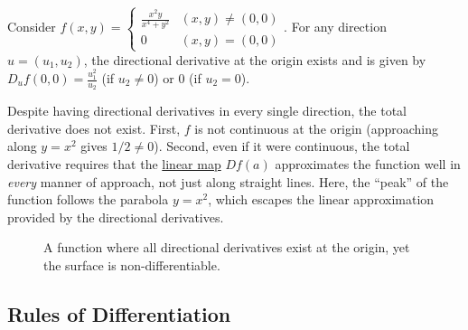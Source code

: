 	\begin{example}
	  \label{ex:all-directional-derivatives-exist-but-not}
		Consider $f(x, y) = \begin{cases} \frac{x^2 y}{x^4 + y^2} & (x, y) \neq (0, 0) \\ 0 & (x, y) = (0, 0) \end{cases}$. For any direction $u = (u_1, u_2)$, the directional derivative at the origin exists and is given by $D_{u}f(0,0) = \frac{u_1^2}{u_2}$ (if $u_2 \neq 0$) or $0$ (if $u_2 = 0$). 
		
		Despite having directional derivatives in every single direction, the total derivative does not exist. First, $f$ is not continuous at the origin (approaching along $y=x^2$ gives $1/2 \neq 0$). Second, even if it were continuous, the total derivative requires that the \hyperref[lin-def:linear_map]{linear map} $Df(a)$ approximates the function well in \textit{every} manner of approach, not just along straight lines. Here, the ``peak'' of the function follows the parabola $y=x^2$, which escapes the linear approximation provided by the directional derivatives.

		\begin{figure}[H]
			\centering
			\caption{A function where all directional derivatives exist at the origin, yet the surface is non-differentiable.}
		\end{figure}
	\end{example}

\subsection{Rules of Differentiation}

